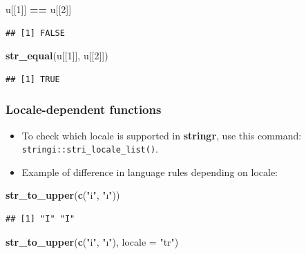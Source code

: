 \documentclass[
]{article}
\newenvironment{Shaded}{\begin{snugshade}}{\end{snugshade}}
\newcommand{\AttributeTok}[1]{\textcolor[rgb]{0.13,0.29,0.53}{#1}}
\newcommand{\DecValTok}[1]{\textcolor[rgb]{0.00,0.00,0.81}{#1}}
\newcommand{\FunctionTok}[1]{\textcolor[rgb]{0.13,0.29,0.53}{\textbf{#1}}}
\newcommand{\NormalTok}[1]{#1}
\newcommand{\SpecialCharTok}[1]{\textcolor[rgb]{0.81,0.36,0.00}{\textbf{#1}}}
\newcommand{\StringTok}[1]{\textcolor[rgb]{0.31,0.60,0.02}{#1}}
\begin{document}
\begin{Shaded}
\begin{Highlighting}[]
\NormalTok{u[[}\DecValTok{1}\NormalTok{]] }\SpecialCharTok{==}\NormalTok{ u[[}\DecValTok{2}\NormalTok{]]}
\end{Highlighting}
\end{Shaded}

\begin{verbatim}
## [1] FALSE
\end{verbatim}

\begin{Shaded}
\begin{Highlighting}[]
\FunctionTok{str\_equal}\NormalTok{(u[[}\DecValTok{1}\NormalTok{]], u[[}\DecValTok{2}\NormalTok{]])}
\end{Highlighting}
\end{Shaded}

\begin{verbatim}
## [1] TRUE
\end{verbatim}

\subsubsection{Locale-dependent
functions}\label{locale-dependent-functions}

\begin{itemize}
\item
  To check which locale is supported in \textbf{stringr}, use this
  command: \texttt{stringi::stri\_locale\_list()}.
\item
  Example of difference in language rules depending on locale:
\end{itemize}

\begin{Shaded}
\begin{Highlighting}[]
\FunctionTok{str\_to\_upper}\NormalTok{(}\FunctionTok{c}\NormalTok{(}\StringTok{"i"}\NormalTok{, }\StringTok{"ı"}\NormalTok{))}
\end{Highlighting}
\end{Shaded}

\begin{verbatim}
## [1] "I" "I"
\end{verbatim}

\begin{Shaded}
\begin{Highlighting}[]
\FunctionTok{str\_to\_upper}\NormalTok{(}\FunctionTok{c}\NormalTok{(}\StringTok{"i"}\NormalTok{, }\StringTok{"ı"}\NormalTok{), }\AttributeTok{locale =} \StringTok{"tr"}\NormalTok{)}
\end{Highlighting}
\end{Shaded}
\end{document}
